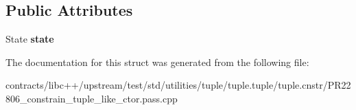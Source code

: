 \subsection*{Public Attributes}
\begin{DoxyCompactItemize}
\item 
\mbox{\label{struct_convertible_from_tuple_and_int_a39d4eb9586c6fd6f0e55fa88feb5ac81}} 
State {\bfseries state}
\end{DoxyCompactItemize}


The documentation for this struct was generated from the following file\+:\begin{DoxyCompactItemize}
\item 
contracts/libc++/upstream/test/std/utilities/tuple/tuple.\+tuple/tuple.\+cnstr/P\+R22806\+\_\+constrain\+\_\+tuple\+\_\+like\+\_\+ctor.\+pass.\+cpp\end{DoxyCompactItemize}
